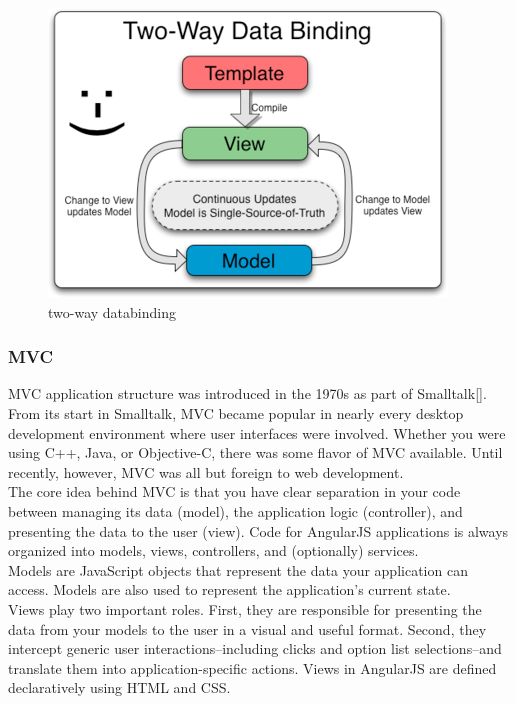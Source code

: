 \documentclass[14pt,a4paper]{extreport}
\begin{document}
\begin{itemize}
			\begin{figure}
				\begin{center}
					\includegraphics[scale=1]{twowaybinding.png}
					\caption{two-way databinding}
					\label{fig:twowaydatabinding}
				\end{center}
			\end{figure}
			\end{itemize}
			\subsubsection{MVC}
			MVC application structure was introduced in the 1970s as part of Smalltalk[]. From its start in Smalltalk, MVC became popular in nearly every desktop development environment where user interfaces were involved. Whether you were using C++, Java, or Objective-C, there was some flavor of MVC available. Until recently, however, MVC was all but foreign to web development.
\\

The core idea behind MVC is that you have clear separation in your code between managing its data (model), the application logic (controller), and presenting the data to the user (view). Code for AngularJS applications is always organized into models, views, controllers, and (optionally) services.
\\

Models are JavaScript objects that represent the data your application can access. Models are also used to represent the application's current state.
\\

Views play two important roles. First, they are responsible for presenting the data from your models to the user in a visual and useful format. Second, they intercept generic user interactions–including clicks and option list selections–and translate them into application-specific actions. Views in AngularJS are defined declaratively using HTML and CSS.
\\
\end{document}
